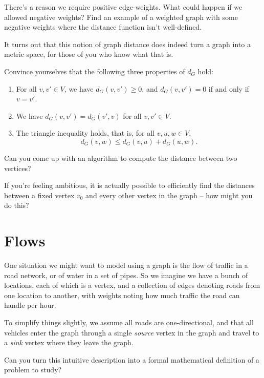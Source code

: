 \documentclass[nobib]{tufte-handout}
\begin{document}
\begin{xca}
  There's a reason we require positive edge-weights. What could happen if we allowed negative weights? Find an example of a weighted graph with some negative weights where the distance function isn't well-defined.
\end{xca}

It turns out that this notion of graph distance does indeed turn a graph into a metric space, for those of you who know what that is.

\begin{xca}
  Convince yourselves that the following three properties of $d_G$ hold:
  \begin{enumerate}
    \item For all $v, v' \in V$, we have $d_G(v, v') \geq 0$, and $d_G(v,v') = 0$ if and only if $v = v'$.
    \item We have $d_G(v,v') = d_G(v',v)$ for all $v, v' \in V$.
    \item The triangle inequality holds, that is, for all $v, u, w \in V$,
    $$d_G(v, w) \leq d_G(v, u) + d_G(u, w).$$
  \end{enumerate}
\end{xca}

\begin{xca}
  Can you come up with an algorithm to compute the distance between two vertices?

  If you're feeling ambitious, it is actually possible to efficiently find the distances between a fixed vertex $v_0$ and every other vertex in the graph -- how might you do this?
\end{xca}

\section{Flows}

One situation we might want to model using a graph is the flow of traffic in a road network, or of water in a set of pipes. So we imagine we have a bunch of locations, each of which is a vertex, and a collection of edges denoting roads from one location to another, with weights noting how much traffic the road can handle per hour.

To simplify things slightly, we assume all roads are one-directional, and that all vehicles enter the graph through a single \emph{source} vertex in the graph and travel to a \emph{sink} vertex where they leave the graph. 

\begin{xca}
  Can you turn this intuitive description into a formal mathematical definition of a problem to study?
\end{xca}
\end{document}

